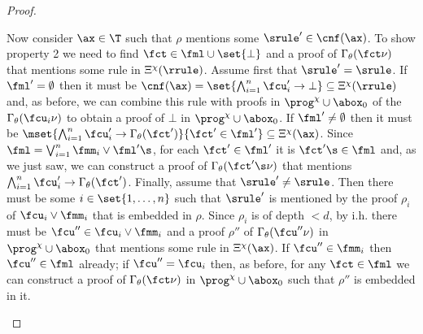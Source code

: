 \begin{proof}
\begin{itemize}
Now consider $\ax\in\T$ such that $\rho$ mentions some $\srule'\in\cnf(\ax)$.
To show property 2 we need to find $\fct\in\fml\cup\set{\bot}$ and a proof of 
$\Gamma_{\theta}(\fct\nu)$ that mentions some rule in $\Xi^{\chi}(\rrule)$.
Assume first that $\srule' = \srule$.
If $\fml'=\emptyset$ then it must be 
$\cnf(\ax) = \set{\bigwedge_{i=1}^n \fcu'_i\to \bot}\subseteq\Xi^{\chi}(\rrule)$ and, as before,
we can combine this rule with proofs in $\prog^{\chi}\cup\abox_0$ of the $\Gamma_{\theta}(\fcu_i\nu)$ 
to obtain a proof of $\bot$ in $\prog^{\chi}\cup\abox_0$.
If $\fml'\neq \emptyset$ then it must be 
$\mset{\bigwedge_{i=1}^n \fcu'_i\to \Gamma_{\theta}(\fct')}{\fct'\in\fml'}\subseteq\Xi^{\chi}(\ax)$.
Since $\fml = \bigvee_{i=1}^n\fmm_i\vee\fml'\s$, for each $\fct'\in\fml'$ it is $\fct'\s\in\fml$ 
and, as we just saw, we can construct a proof of $\Gamma_{\theta}(\fct'\s\nu)$ that mentions
$\bigwedge_{i=1}^n \fcu'_i\to \Gamma_{\theta}(\fct')$.
%
Finally, assume that $\srule' \neq \srule$.
Then there must be some $i\in\set{1,\dots,n}$ such that $\srule'$ is mentioned by the proof 
$\rho_i$ of $\fcu_i\vee\fmm_i$ that is embedded in $\rho$.
Since $\rho_i$ is of depth $<d$, by i.h. there must be $\fcu''\in\fcu_i\vee\fmm_i$
and a proof $\rho''$ of $\Gamma_{\theta}(\fcu''\nu)$ in $\prog^{\chi}\cup\abox_0$ that mentions
some rule in $\Xi^{\chi}(\ax)$. If $\fcu'' \in \fmm_i$ then $\fcu''\in \fml$ already; if $\fcu'' = \fcu_i$ 
then, as before, for any $\fct\in\fml$ we can construct a proof of $\Gamma_{\theta}(\fct\nu)$ 
in $\prog^{\chi}\cup\abox_0$ such that $\rho''$ is embedded in it.
\qedhere
\end{itemize}
\end{proof}


